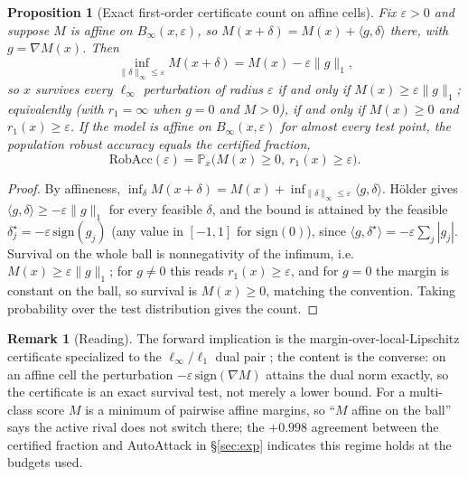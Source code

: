 \documentclass{article}
\newtheorem{proposition}{Proposition}
\theoremstyle{definition}
\newtheorem{remark}{Remark}
\begin{document}
\begin{proposition}[Exact first-order certificate count on affine cells]\label{prop:count}
Fix $\varepsilon>0$ and suppose $M$ is affine on $B_\infty(x,\varepsilon)$, so $M(x+\delta)=M(x)+\langle g,\delta\rangle$ there, with $g=\nabla M(x)$. Then
\[
\inf_{\|\delta\|_\infty\le\varepsilon}M(x+\delta)=M(x)-\varepsilon\|g\|_1,
\]
so $x$ survives every $\ell_\infty$ perturbation of radius $\varepsilon$ if and only if $M(x)\ge\varepsilon\|g\|_1$; equivalently (with $r_1=\infty$ when $g=0$ and $M>0$), if and only if $M(x)\ge0$ and $r_1(x)\ge\varepsilon$. If the model is affine on $B_\infty(x,\varepsilon)$ for almost every test point, the population robust accuracy equals the certified fraction,
\[
\mathrm{RobAcc}(\varepsilon)=\mathbb P_x\big(M(x)\ge0,\ r_1(x)\ge\varepsilon\big).
\]
\end{proposition}
\begin{proof}
By affineness, $\inf_\delta M(x+\delta)=M(x)+\inf_{\|\delta\|_\infty\le\varepsilon}\langle g,\delta\rangle$. H\"older gives $\langle g,\delta\rangle\ge-\varepsilon\|g\|_1$ for every feasible $\delta$, and the bound is attained by the feasible $\delta^\star_j=-\varepsilon\,\mathrm{sign}(g_j)$ (any value in $[-1,1]$ for $\mathrm{sign}(0)$), since $\langle g,\delta^\star\rangle=-\varepsilon\sum_j|g_j|$. Survival on the whole ball is nonnegativity of the infimum, i.e.\ $M(x)\ge\varepsilon\|g\|_1$; for $g\neq0$ this reads $r_1(x)\ge\varepsilon$, and for $g=0$ the margin is constant on the ball, so survival is $M(x)\ge0$, matching the convention. Taking probability over the test distribution gives the count.
\end{proof}

\begin{remark}[Reading]\label{rem:count-reading}
The forward implication is the margin-over-local-Lipschitz certificate specialized to the $\ell_\infty/\ell_1$ dual pair \citep{hein2017formal,tsuzuku2018lipschitz}; the content is the converse: on an affine cell the perturbation $-\varepsilon\,\mathrm{sign}(\nabla M)$ attains the dual norm exactly, so the certificate is an exact survival test, not merely a lower bound. For a multi-class score $M$ is a minimum of pairwise affine margins, so ``$M$ affine on the ball'' says the active rival does not switch there; the $+0.998$ agreement between the certified fraction and AutoAttack in \S\ref{sec:exp} indicates this regime holds at the budgets used.
\end{remark}
\end{document}
